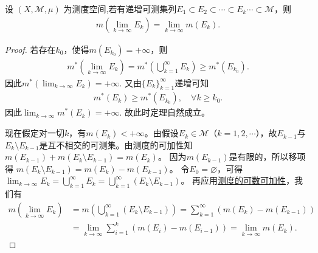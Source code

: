 \documentclass[../../main.tex]{subfiles}%
\begin{document}
\begin{theorem}[递增可测集列的测度运算]\label{theorem:递增可测集列的测度运算}
设 $(X,\mathscr{M},\mu)$ 为测度空间,若有递增可测集列$E_1\subset E_2\subset\cdots\subset E_k\cdots\subset \mathscr{M}$，则
\begin{align}
m\left(\lim_{k\to\infty}E_k\right)=\lim_{k\to\infty}m(E_k).\label{eq:2.4}
\end{align}
\end{theorem}
\begin{proof}
若存在$k_0$，使得$m(E_{k_0})=+\infty$，则
\begin{align*}
m^*\left(\lim_{k\rightarrow \infty}E_k\right) = m^*\left(\bigcup_{k=1}^{\infty}E_k\right)\geqslant m^*(E_{k_0}).
\end{align*}
因此$m^*\left(\lim_{k\rightarrow \infty}E_k\right) = +\infty$. 又由$\{E_k\}_{k=1}^{\infty}$递增可知
\begin{align*}
m^*(E_k) \geqslant m^*(E_{k_0}), \quad \forall k \geqslant k_0.
\end{align*}
因此$\lim_{k\rightarrow \infty}m^*(E_k) = +\infty$.
故此时定理自然成立。

现在假定对一切$k$，有$m(E_k)<+\infty$。由假设$E_k\in\mathscr{M}$（$k = 1,2,\cdots$），故$E_{k - 1}$与$E_k\setminus E_{k - 1}$是互不相交的可测集。由测度的可加性知
$m(E_{k - 1})+m(E_k\setminus E_{k - 1})=m(E_k)$。
因为$m(E_{k - 1})$是有限的，所以移项得
$m(E_k\setminus E_{k - 1})=m(E_k)-m(E_{k - 1})$。
令$E_0 = \varnothing$，可得
$\lim_{k\to\infty}E_k=\bigcup_{k = 1}^{\infty}E_k=\bigcup_{k = 1}^{\infty}(E_k\setminus E_{k - 1})$。
再应用\hyperref[theorem:测度的基本性质]{测度的可数可加性}，我们有
\begin{align*}
m\left(\lim_{k\to\infty}E_k\right)&=m\left(\bigcup_{k = 1}^{\infty}(E_k\setminus E_{k - 1})\right)
=\sum_{k = 1}^{\infty}(m(E_k)-m(E_{k - 1}))\\
&=\lim_{k\to\infty}\sum_{i = 1}^{k}(m(E_i)-m(E_{i - 1}))
=\lim_{k\to\infty}m(E_k).
\end{align*}
\end{proof}
\end{document}
